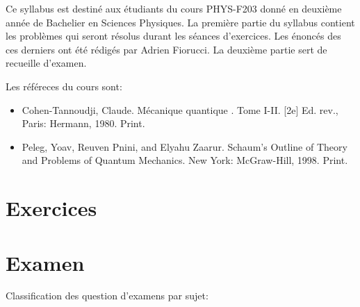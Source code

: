 \documentclass[a4paper,10pt]{book}
\begin{document}


\nocite{*}

\thispagestyle{plain}

Ce syllabus est destiné aux étudiants du cours PHYS-F203 donné en deuxième année de Bachelier en Sciences Physiques. La première partie du syllabus contient les problèmes qui seront résolus durant les séances d'exercices. Les énoncés des ces derniers ont été rédigés par Adrien Fiorucci. La deuxième partie sert de recueille d'examen.

Les référeces du cours sont: 
\begin{itemize}[label=\textbullet]
    \item Cohen-Tannoudji, Claude. Mécanique quantique . Tome I-II. [2e] Ed. rev., Paris: Hermann, 1980. Print.
    \item Peleg, Yoav, Reuven Pnini, and Elyahu Zaarur. Schaum's Outline of Theory and Problems of Quantum Mechanics. New York: McGraw-Hill, 1998. Print.
\end{itemize}

\vspace{17cm}



\pagebreak

\thispagestyle{plain}

\tableofcontents

\part{Exercices}

\makeatletter
\renewcommand{\@chapapp}{Séance}
\makeatother















\part{Examen}

\makeatletter
\renewcommand{\@chapapp}{Examen}
\makeatother

\thispagestyle{plain}

Classification des question d'examens par sujet:
\end{document}
